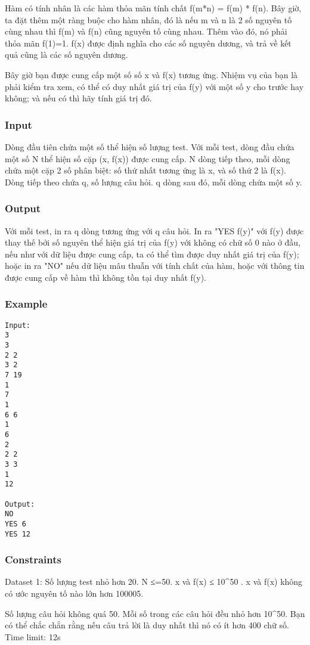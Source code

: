 



   Hàm có tính nhân là các hàm thỏa mãn tính chất f(m*n) = f(m) * f(n). Bây giờ, ta đặt thêm một ràng buộc cho hàm nhân, đó là nếu m và n là 2 số nguyên tố cùng nhau thì f(m) và f(n) cũng nguyên tố cùng nhau. Thêm vào đó, nó phải thỏa mãn f(1)=1. f(x) được định nghĩa cho các số nguyên dương, và trả về kết quả cũng là các số nguyên dương.  

   Bây giờ bạn được cung cấp một số số x và f(x) tương ứng. Nhiệm vụ của bạn là phải kiểm tra xem, có thể có duy nhất giá trị của f(y) với một số y cho trước hay không; và nếu có thì hãy tính giá trị đó.  

\subsubsection{   Input  }

   Dòng đầu tiên chứa một số thể hiện số lượng test. Với mỗi test, dòng đầu chứa một số N thể hiện số cặp (x, f(x)) được cung cấp. N dòng tiếp theo, mỗi dòng chứa một cặp 2 số phân biệt: số thứ nhất tương ứng là x, và số thứ 2 là f(x). Dòng tiếp theo chứa q, số lượng câu hỏi. q dòng sau đó, mỗi dòng chứa một số y.  

\subsubsection{   Output  }

   Với mỗi test, in ra q dòng tương ứng với q câu hỏi. In ra "YES f(y)" với f(y) được thay thế bởi số nguyên thể hiện giá trị của f(y) với không có chữ số 0 nào ở đầu, nếu như với dữ liệu được cung cấp, ta có thể tìm được duy nhất giá trị của f(y); hoặc in ra "NO" nếu dữ liệu mâu thuẫn với tính chất của hàm, hoặc với thông tin được cung cấp về hàm thì không tồn tại duy nhất f(y).  

\subsubsection{   Example  }
\begin{verbatim}
Input:
3
3
2 2
3 2
7 19
1
7
1
6 6
1
6
2
2 2
3 3
1
12

Output:
NO
YES 6
YES 12
\end{verbatim}

\subsubsection{   Constraints  }

   Dataset 1: Số lượng test nhỏ hơn 20. N ≤=50. x và f(x) ≤ 10\textasciicircum50 . x và f(x) không có ước nguyên tố nào lớn hơn 100005.  

   Số lượng câu hỏi không quá 50. Mỗi số trong các câu hỏi đều nhỏ hơn 10\textasciicircum50. Bạn có thể chắc chắn rằng nếu câu trả lời là duy nhất thì nó có ít hơn 400 chữ số. Time limit: 12s  